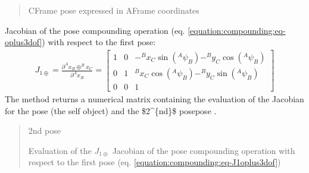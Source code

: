 \documentclass[letterpaper,10pt,english]{sphinxmanual}
\begin{document}
\begin{fulllineitems}
\begin{fulllineitems}
\begin{quote}
\begin{description}
\sphinxAtStartPar
C\sphinxhyphen{}Frame pose expressed in A\sphinxhyphen{}Frame coordinates

\end{description}\end{quote}

\end{fulllineitems}


\begin{fulllineitems}
\label{\detokenize{compounding:Pose3D.Pose3D.J_1oplus}}
\pysigstartsignatures
{}
\pysigstopsignatures
\sphinxAtStartPar
Jacobian of the pose compounding operation (eq. \eqref{equation:compounding:eq-oplus3dof}) with respect to the first pose:
\begin{equation}\label{equation:compounding:eq-J1oplus3dof}
\begin{split}J_{1\oplus}=\frac{\partial  ^Ax_B \oplus ^Bx_C}{\partial ^Ax_B} =
\begin{bmatrix}
    1 & 0 &  -^Bx_C \sin(^A\psi_B) - ^By_C \cos(^A\psi_B) \\
    0 & 1 &  ^Bx_C \cos(^A\psi_B) - ^By_C \sin(^A\psi_B) \\
    0 & 0 & 1
\end{bmatrix}\end{split}
\end{equation}
\sphinxAtStartPar
The method returns a numerical matrix containing the evaluation of the Jacobian for the pose  (the self object) and the \$2\textasciicircum{}\{nd\}\$ posepose .
\begin{quote}\begin{description}
\sphinxAtStartPar
{} \textendash{} 2nd pose

\sphinxAtStartPar
Evaluation of the \(J_{1\oplus}\) Jacobian of the pose compounding operation with respect to the first pose (eq. \eqref{equation:compounding:eq-J1oplus3dof})

\end{description}\end{quote}

\end{fulllineitems}


\end{fulllineitems}
\end{document}
